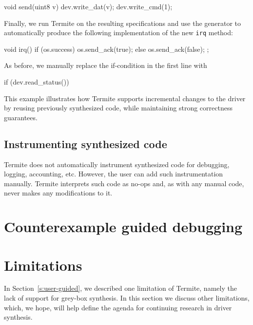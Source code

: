 \documentclass{book}
\newcommand{\termite}{Termite\xspace}
\theoremstyle{definition}
\newcommand{\src}[1]{\texttt{\small #1}}
\begin{document}
\begin{tsllisting}[keywords=, frame=single]
void send(uint8 v){
    dev.write_dat(v);
    dev.write_cmd(1);}
\end{tsllisting}

Finally, we run \termite on the resulting specifications and use the generator to automatically produce the following implementation of the new \src{irq} method:

\begin{tsllisting}[keywords=, frame=single]
void irq(){
    if (os.success) {
        os.send_ack(true);
    } else {
        os.send_ack(false);
    };}
\end{tsllisting}

As before, we manually replace the if-condition in the first line with

\begin{tsllisting}[keywords=, frame=single]
if (dev.read_status())
\end{tsllisting}

This example illustrates how \termite supports incremental changes to the driver by reusing previously synthesized code, while maintaining strong correctness guarantees.

\subsection{Instrumenting synthesized code~~} 
\termite does not automatically instrument synthesized code for debugging, logging, accounting, etc.  However, the user can add such instrumentation manually.  \termite interprets such code as no-ops and, as with any manual code, never makes any modifications to it.

\section{Counterexample guided debugging}
\section{Limitations}\label{s:limitations}

In Section~\ref{s:user-guided}, we described one limitation of \termite, namely the lack of support for grey-box synthesis.  In this section we discuss other limitations, which, we hope, will help define the agenda for continuing research in driver synthesis.

\end{document}
